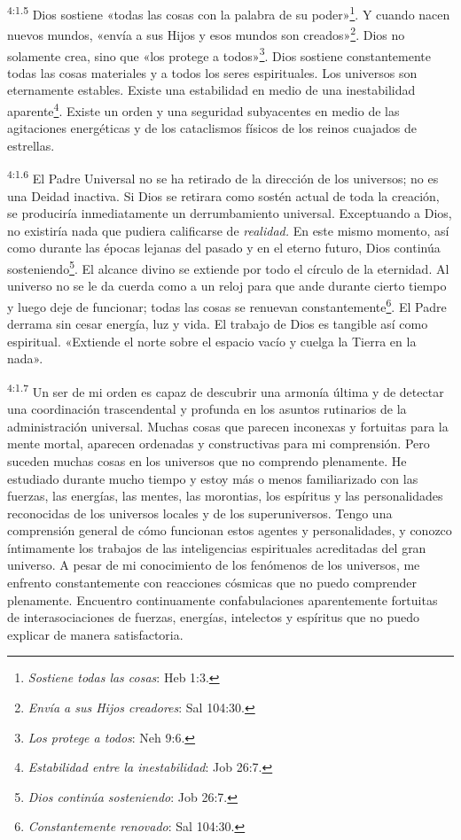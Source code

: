 \par
\textsuperscript{4:1.5} Dios sostiene «todas las cosas con la palabra de su poder»\footnote{\textit{Sostiene todas las cosas}: Heb 1:3.}. Y cuando nacen nuevos mundos, «envía a sus Hijos y esos mundos son creados»\footnote{\textit{Envía a sus Hijos creadores}: Sal 104:30.}. Dios no solamente crea, sino que «los protege a todos»\footnote{\textit{Los protege a todos}: Neh 9:6.}. Dios sostiene constantemente todas las cosas materiales y a todos los seres espirituales. Los universos son eternamente estables. Existe una estabilidad en medio de una inestabilidad aparente\footnote{\textit{Estabilidad entre la inestabilidad}: Job 26:7.}. Existe un orden y una seguridad subyacentes en medio de las agitaciones energéticas y de los cataclismos físicos de los reinos cuajados de estrellas.

\par
\textsuperscript{4:1.6} El Padre Universal no se ha retirado de la dirección de los universos; no es una Deidad inactiva. Si Dios se retirara como sostén actual de toda la creación, se produciría inmediatamente un derrumbamiento universal. Exceptuando a Dios, no existiría nada que pudiera calificarse de \textit{realidad.} En este mismo momento, así como durante las épocas lejanas del pasado y en el eterno futuro, Dios continúa sosteniendo\footnote{\textit{Dios continúa sosteniendo}: Job 26:7.}. El alcance divino se extiende por todo el círculo de la eternidad. Al universo no se le da cuerda como a un reloj para que ande durante cierto tiempo y luego deje de funcionar; todas las cosas se renuevan constantemente\footnote{\textit{Constantemente renovado}: Sal 104:30.}. El Padre derrama sin cesar energía, luz y vida. El trabajo de Dios es tangible así como espiritual. «Extiende el norte sobre el espacio vacío y cuelga la Tierra en la nada».

\par
\textsuperscript{4:1.7} Un ser de mi orden es capaz de descubrir una armonía última y de detectar una coordinación trascendental y profunda en los asuntos rutinarios de la administración universal. Muchas cosas que parecen inconexas y fortuitas para la mente mortal, aparecen ordenadas y constructivas para mi comprensión. Pero suceden muchas cosas en los universos que no comprendo plenamente. He estudiado durante mucho tiempo y estoy más o menos familiarizado con las fuerzas, las energías, las mentes, las morontias, los espíritus y las personalidades reconocidas de los universos locales y de los superuniversos. Tengo una comprensión general de cómo funcionan estos agentes y personalidades, y conozco íntimamente los trabajos de las inteligencias espirituales acreditadas del gran universo. A pesar de mi conocimiento de los fenómenos de los universos, me enfrento constantemente con reacciones cósmicas que no puedo comprender plenamente. Encuentro continuamente confabulaciones aparentemente fortuitas de interasociaciones de fuerzas, energías, intelectos y espíritus que no puedo explicar de manera satisfactoria.

